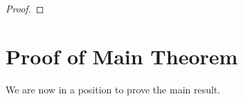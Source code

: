 \documentclass[12pt]{amsart}
\theoremstyle{plain}
\theoremstyle{plain}
\theoremstyle{definition}
\theoremstyle{remark}
\numberwithin{equation}{subsection}
\newcommand{\hdel}{\tilde{\nabla}}
\begin{document}
\begin{proof}
\begin{comment}
    \begin{equation}
        E_p(t) = \int_M lQ^p\Phi d\mu_h.
    \end{equation}
    Then we have
    \begin{align}
        \frac{\partial}{\partial t} E_p(t) &\leq \int_M g^{ij}\hdel_i\hdel_j(lQ^p)\Phi d\mu_h \nonumber \\
        &= \int_M lQ^p\hdel_i\hdel_j(g^{ij}\Phi)d\mu_h \nonumber \\
        &\leq C_4r^{-2}\int_M lQ^p\Phi^{1-\frac{1}{m}}d\mu_h + C_4\int_M lQ^p|\hdel g||\hdel\Phi|d\mu_h \nonumber \\
        &\quad + C_4\int_M lQ^p\left(|\hdel g|^2 + |\hdel^2g|\right)d\mu_h.
    \end{align}
    Then, performing much of the same computations as in the case for $p=1$ above, we arrive at
    \begin{align}
        \frac{\partial}{\partial t} (E_p(t))^\frac{1}{m} &\leq C_4r^\frac{n}{m}\left(t^{-1-\frac{p}{2m}+\frac{\delta}{p}+\frac{\delta}{2m}} + t^{-1-\frac{p}{2m}+\frac{\delta}{2p}+\frac{\delta}{2m}} + r^{-2}t^{\frac{p}{2m}(-1+\frac{\delta}{p})} \right. \nonumber \\
        &\qquad\qquad\quad \left. + r^{-1}t^{-\frac{1}{2}-\frac{p}{2m}+\frac{\delta}{2p}+\frac{\delta}{2m}}\right).
    \end{align}
    In particular, we apply assumption (ii) for $p > 1$. Integrating from $0$ to $t$ and applying the assumption $\sqrt{t} \leq r$, we obtain
    \begin{align}
        E_p(t)^\frac{1}{m} &\leq E_p(0)^\frac{1}{m} + C_4r^{\frac{1}{m}\left(n-p+\delta\right)} \nonumber \\
        &\leq (C_M + C_4)r^{\frac{1}{m}(n-p+\delta)} + \sigma^\frac{1}{m}r^n
    \end{align}
    for $m$ large enough. Finally, taking $m$-th powers and letting $\sigma \to 0$, we obtain the result for $p > 1$.
    \end{comment}
\end{proof}

\section{Proof of Main Theorem}\label{sec:proof-of-main-theorem}

We are now in a position to prove the main result.
\end{document}
